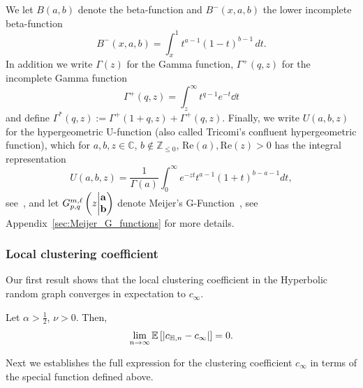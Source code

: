 We let $B(a,b)$ denote the beta-function 
and $B^-(x,a,b)$ the lower incomplete beta-function
\[
	B^-(x,a,b) = \int_x^1 t^{a-1}(1-t)^{b-1} \, dt.
\]
In addition we write $\Gamma(z)$ for the Gamma function, $\Gamma^+(q,z)$ for the incomplete Gamma function
\[
	\Gamma^+(q,z) = \int_z^\infty t^{q - 1} e^{-t} \dd t
\]
and define $\Gamma^\ast(q,z) := \Gamma^+(1 + q, z) + \Gamma^+(q, z)$. Finally, we write $U(a,b,z)$ for the hypergeometric U-function (also called Tricomi's confluent hypergeometric function), which for $a,b,z\in \mathbb{C}$, $b \not \in \mathbb{Z}_{\leq 0}$, $\mathrm{Re}(a), \mathrm{Re}(z) >0$ has the integral representation 
\[
	U(a,b,z) = \frac{1}{\Gamma(a)} \int_0^\infty e^{-zt} t^{a-1} (1+t)^{b-a-1} dt,
\] 
see~\cite[p.255 Equation (2)]{erdelyi1953higher}, and let $\MeijerGnew{m}{\ell}{p}{q}{{\bf a}}{{\bf b}}{z}$ denote Meijer's G-Function~\cite{meijer1946gfunction}, see Appendix~\ref{sec:Meijer_G_functions} for more details.

\subsubsection{Local clustering coefficient}


Our first result shows that the local clustering coefficient in the Hyperbolic random graph converges in expectation to $c_\infty$.

\begin{theorem} \label{thm:clustering_coefficient_hyperbolic}
Let $\alpha > \frac{1}{2}$, $\nu > 0$. Then,
\[
	\lim_{n \to \infty} \Exp{\left|c_{\H,n} - c_\infty\right|} = 0.
\]
\end{theorem}

Next we establishes the full expression for the clustering coefficient $c_\infty$ in terms of the special function defined above.

